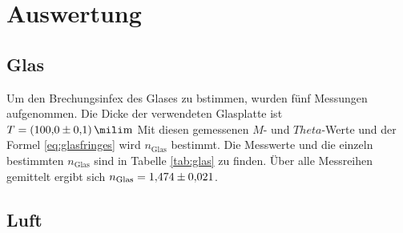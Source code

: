\section{Auswertung}
\label{sec:Auswertung}
\subsection{Glas}
Um den Brechungsinfex des Glases zu bstimmen, wurden fünf Messungen aufgenommen. Die Dicke der verwendeten Glasplatte ist $T=\SI{100\pm 0.1}{\mili\meter}$
Mit diesen gemessenen $M$- und $Theta$-Werte und der Formel \eqref{eq:glasfringes} wird $n_\text{Glas}$ bestimmt. Die Messwerte und die einzeln bestimmten
 $n_\text{Glas}$ sind in Tabelle \ref{tab:glas} zu finden.
Über alle Messreihen gemittelt ergibt sich $n_\text{Glas}=\num{1.474\pm 0.021}$.
\subsection{Luft}
